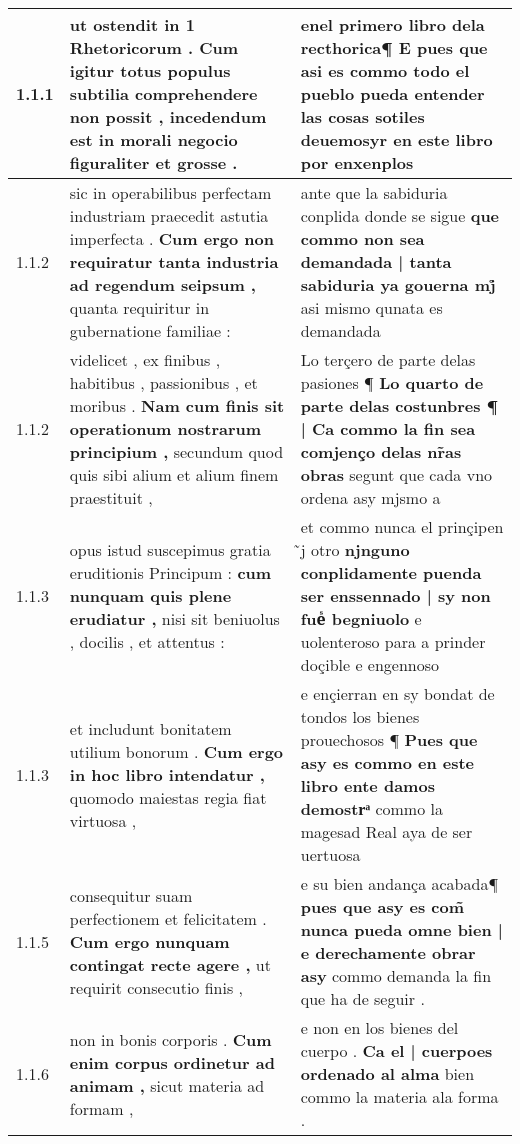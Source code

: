 \begin{tabular}{|p{1cm}|p{6.5cm}|p{6.5cm}|}

\hline
1.1.1 & ut ostendit in 1 Rhetoricorum . \textbf{ Cum igitur totus populus subtilia comprehendere non possit , } incedendum est in morali negocio figuraliter et grosse . & enel primero libro dela recthorica¶ \textbf{ E pues que asi es commo todo el pueblo pueda entender las cosas sotiles } deuemosyr en este libro por enxenplos \\\hline
1.1.2 & sic in operabilibus perfectam industriam praecedit astutia imperfecta . \textbf{ Cum ergo non requiratur tanta industria ad regendum seipsum , } quanta requiritur in gubernatione familiae : & ante que la sabiduria conplida donde se sigue \textbf{ que commo non sea demandada | tanta sabiduria ya gouerna mj̊ } asi mismo qunata es demandada \\\hline
1.1.2 & videlicet , ex finibus , habitibus , passionibus , et moribus . \textbf{ Nam cum finis sit operationum nostrarum principium , } secundum quod quis sibi alium et alium finem praestituit , & Lo terçero de parte delas pasiones ¶ \textbf{ Lo quarto de parte delas costunbres ¶ | Ca commo la fin sea comjenço delas nr̃as obras } segunt que cada vno ordena asy mjsmo a \\\hline
1.1.3 & opus istud suscepimus gratia eruditionis Principum : \textbf{ cum nunquam quis plene erudiatur , } nisi sit beniuolus , docilis , et attentus : & et commo nunca el prinçipen ̃j otro \textbf{ njnguno conplidamente puenda ser enssennado | sy non fueᷤ begniuolo } e uolenteroso para a prinder doçible e engennoso \\\hline
1.1.3 & et includunt bonitatem utilium bonorum . \textbf{ Cum ergo in hoc libro intendatur , } quomodo maiestas regia fiat virtuosa , & e ençierran en sy bondat de tondos los bienes prouechosos ¶ \textbf{ Pues que asy es commo en este libro ente damos demostrͣ } commo la magesad Real aya de ser uertuosa \\\hline
1.1.5 & consequitur suam perfectionem et felicitatem . \textbf{ Cum ergo nunquam contingat recte agere , } ut requirit consecutio finis , & e su bien andança acabada¶ \textbf{ pues que asy es com̃ nunca pueda omne bien | e derechamente obrar asy } commo demanda la fin que ha de seguir . \\\hline
1.1.6 & non in bonis corporis . \textbf{ Cum enim corpus ordinetur ad animam , } sicut materia ad formam , & e non en los bienes del cuerpo . \textbf{ Ca el | cuerpoes ordenado al alma } bien commo la materia ala forma . \\\hline

\end{tabular}
